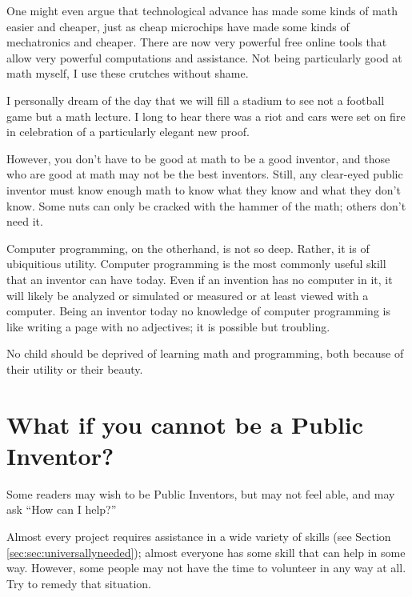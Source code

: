 \documentclass[
	fontsize=10pt, %
	twoside=false, %
	secnumdepth=1, %
]{kaobook}
\begin{document}
One might even argue that technological advance has made some kinds
of math easier and cheaper, just as cheap microchips have made some kinds of
mechatronics and cheaper. There are now very powerful free online tools
that allow very powerful computations and assistance.
Not being particularly good at math myself, I use these crutches without shame.

I personally dream of the day that we will fill a stadium to see not
a football game but a math lecture. I long to hear there was a riot and
cars were set on fire in celebration of a particularly elegant new proof.

However, you don't have to be good at math to be a good inventor, and
those who are good at math may not be the best inventors. Still,
any clear-eyed public inventor must know enough math to know what
they know and what they don't know. Some nuts can only be cracked
with the hammer of the math; others don't need it.

Computer programming, on the otherhand, is not so deep.
Rather, it is of ubiquitious utility. Computer programming
is the most commonly useful skill that an inventor can have today.
Even if an invention has no computer in it, it will likely be
analyzed or simulated or measured or at least viewed with a
computer. Being an inventor today no knowledge of computer
programming is like writing a page with no adjectives;
it is possible but troubling.

No child should be deprived of learning math and programming,
both because of their utility or their beauty.



\chapter{What if you cannot be a Public Inventor?}

Some readers may wish to be Public Inventors, but may not
feel able, and may ask ``How can I help?''

Almost every project requires assistance in a wide variety
of skills (see Section \ref{sec:sec:universallyneeded}); almost everyone has some skill that can help in some way.
However, some people may not have the time to volunteer in any way
at all. Try to remedy that situation.
\end{document}
